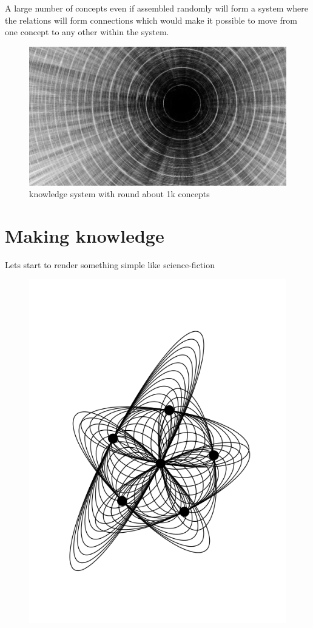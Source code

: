 \documentclass[11pt]{article}
\begin{document}
A large number of concepts even if assembled randomly 
will form a system where the relations will form connections 
which would make it possible to move from one concept to any other within 
the system.

\begin{figure}[htp]
\centering
\includegraphics[scale=0.40]{img/1362924302_directories.png}
\caption{knowledge system with round about 1k concepts}
\label{every thought is interlocked somewhere at some point}
\end{figure}



\section{Making knowledge}
Lets start to render something simple like 
science-fiction


\begin{figure}[htp]
\centering
\includegraphics[scale=0.80]{img/science_fiction_directories.png}
\caption{}
\label{}
\end{figure}
\end{document}
